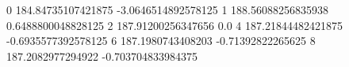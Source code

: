 0 184.84735107421875 -3.0646514892578125
1 188.56088256835938 0.6488800048828125
2 187.91200256347656 0.0
4 187.21844482421875 -0.6935577392578125
6 187.1980743408203 -0.71392822265625
8 187.2082977294922 -0.703704833984375
